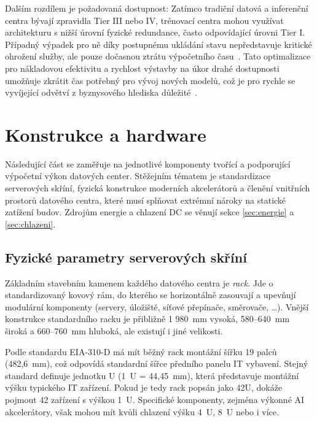 Dalším rozdílem je požadovaná dostupnost: Zatímco tradiční datová a inferenční centra bývají zpravidla Tier III nebo IV, trénovací centra mohou využívat architekturu s nižší úrovní fyzické redundance, často odpovídající úrovni Tier I. Případný výpadek pro ně díky postupnému ukládání stavu nepředstavuje kritické ohrožení služby, ale pouze dočasnou ztrátu výpočetního času~\cite[s.~83]{barroso_data_2026}. Tato optimalizace pro nákladovou efektivitu a rychlost výstavby na úkor drahé dostupnosti umožňuje zkrátit čas potřebný pro vývoj nových modelů, což je pro rychle se vyvíjející odvětví z byznysového hlediska důležité~\cite[s.~24]{ginzburg-ganz_technical_2025}.

\section{Konstrukce a hardware}
\label{sec:konstrukce}


Následující část se zaměřuje na jednotlivé komponenty tvořící a podporující výpočetní výkon datových center. Stěžejním tématem je standardizace serverových skříní, fyzická konstrukce moderních akcelerátorů a členění vnitřních prostorů datového centra, které musí splňovat extrémní nároky na statické zatížení budov. Zdrojům energie a chlazení DC se věnují sekce \ref{sec:energie} a \ref{sec:chlazeni}.

\subsection{Fyzické parametry serverových skříní}
\label{subsec:racky}

Základním stavebním kamenem každého datového centra je \textit{rack}. Jde o standardizovaný kovový rám, do kterého se horizontálně zasouvají a upevňují modulární komponenty (servery, úložiště, síťové přepínače, směrovače, \dots{}). Vnější konstrukce standardního racku je přibližně 1 980~mm vysoká, 580--640~mm široká a 660--760~mm hluboká, ale existují i jiné velikosti.~\cite[s.~2940]{kant_data_2009}

Podle standardu EIA-310-D má mít běžný rack montážní šířku 19 palců (482,6~mm), což odpovídá standardní šířce předního panelu IT vybavení. Stejný standard definuje jednotku U (1~U = 44,45~mm), která představuje montážní výšku typického IT zařízení. Pokud je tedy rack popsán jako 42U, dokáže pojmout 42 zařízení s výškou 1~U. Specifické komponenty, zejména výkonné AI akcelerátory, však mohou mít kvůli chlazení výšku 4~U, 8~U nebo i více.~\cite{hu_how_2020}

